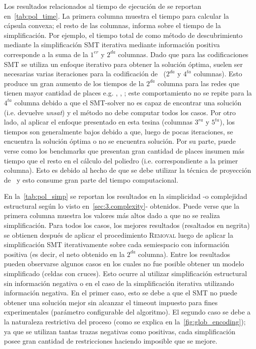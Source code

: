 Los resultados relacionados al tiempo de ejecución de \pachtool se reportan en~\autoref{tab:pol_time}.
La primera columna muestra el tiempo para calcular la cápsula convexa; el resto de las columnas, informa
sobre el tiempo de la simplificación. Por ejemplo, el tiempo total de \pachtool como método de descubrimiento
mediante la simplificación SMT iterativa mediante información positiva corresponde a la suma de la $1^{er}$ y $2^{da}$ columnas.
Dado que para las codificaciones SMT se utiliza un enfoque iterativo para obtener la solución óptima,
suelen ser necesarias varias iteraciones para la codificación de~\cite{LeonCB15} ($2^{da}$ y $4^{ta}$ columnas). 
Esto produce un gran aumento de los tiempos de la $2^{da}$ columna para las redes que tienen mayor cantidad de places
e.g. , , ; este comportamiento no se repite para la $4^{ta}$ columna
debido a que el SMT-solver no es capaz de encontrar una solución (i.e. devuelve \emph{unsat}) y el método no debe computar todos los casos.
Por otro lado, al aplicar el enfoque presentado en esta tesina (columnas $3^{ra}$ y $5^{ta}$), los tiempos son 
generalmente bajos debido a que, luego de pocas iteraciones, se encuentra la solución óptima o no se encuentra solución.
Por su parte, puede verse como los benchmarks que presentan gran cantidad de places insumen más tiempo que el resto
en el cálculo del poliedro (i.e. correspondiente a la primer columna). Esto es debido al hecho de que se debe
utilizar la técnica de proyección de~\cite{CarmonaC14} y esto consume gran parte del tiempo computacional.




En la~\autoref{tab:pol_simp} se reportan los resultados en la simplicidad -o complejidad estructural
según lo visto en~\autoref{sec:3.complexity}- obtenidos. 
Puede verse que la primera columna muestra los valores más altos dado a que no se realiza simplificación.
Para todos los casos, los mejores resultados (resaltados en negrita) se obtienen después de aplicar el 
procedimiento \textsc{Removal} luego de aplicar la simplificación SMT iterativamente sobre cada semiespacio
con información positiva (es decir, el neto obtenido en la $2^{da}$ columna). 
Entre los resultados pueden observarse algunos casos en los cuales no fue posible obtener
un modelo simplificado (celdas con cruces). Esto ocurre al utilizar simplificación estructural 
sin información negativa o en el caso de la simplificación iterativa utilizando información negativa.
En el primer caso, esto se debe a que el SMT no puede obtener una solución mejor sin alcanzar el timeout impuesto
para fines experimentales (parámetro configurable del algoritmo). El segundo caso se debe a la naturaleza restrictiva
del proceso (como se explica en la~\autoref{fig:glob_encoding}); ya que se utilizan tantas trazas negativas como positivas,
cada simplificación posee gran cantidad de restricciones haciendo imposible que se mejore.


